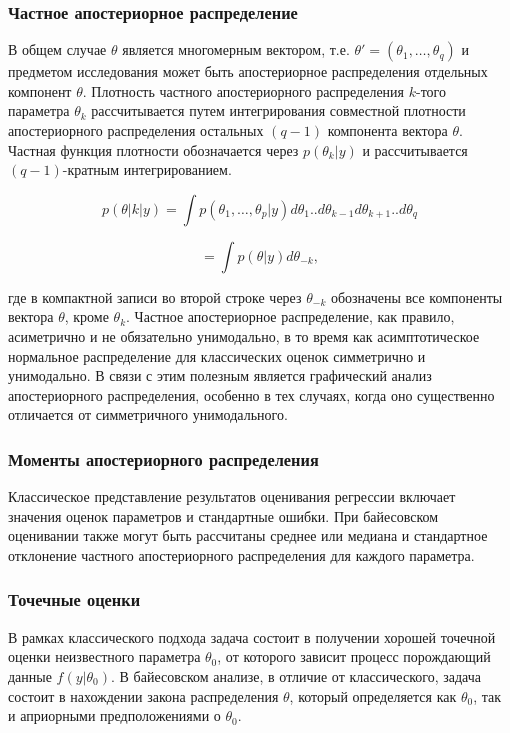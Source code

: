 \subsubsection*{Частное апостериорное распределение}

В общем случае $\theta$ является многомерным вектором, т.е. $\theta'=(\theta_1,\ldots ,\theta_q)$ и предметом исследования может быть апостериорное распределения отдельных компонент $\theta$. Плотность частного апостериорного распределения $k$-того параметра $\theta_k$ рассчитывается путем интегрирования совместной плотности апостериорного распределения остальных $(q-1)$ компонента вектора $\theta$. Частная функция плотности обозначается через $p(\theta_k|y)$ и рассчитывается $(q-1)$-кратным интегрированием.

\begin{equation}
p(\theta|k|y)=\int{p(\theta_1,\ldots ,\theta_p|y)d\theta_1..d\theta_{k-1}d\theta_{k+1}..d\theta_q}
\end{equation}

\[
=\int{p(\theta|y)d\theta_{-k}},
\]

где в компактной записи во второй строке через $\theta_{-k}$ обозначены все компоненты вектора $\theta$, кроме $\theta_k$. Частное апостериорное распределение, как правило, асиметрично и не обязательно унимодально, в то время как асимптотическое нормальное распределение для классических оценок симметрично и унимодально. В связи с этим полезным является графический анализ апостериорного распределения, особенно в тех случаях, когда оно существенно отличается от симметричного унимодального.

\subsubsection*{Моменты апостериорного распределения}

Классическое представление результатов оценивания регрессии включает значения оценок параметров и стандартные ошибки. При байесовском оценивании также могут быть рассчитаны среднее или медиана и стандартное отклонение частного апостериорного распределения для каждого параметра.

\subsubsection*{Точечные оценки}

В рамках классического подхода задача состоит в получении хорошей точечной оценки неизвестного  параметра $\theta_0$, от которого зависит процесс порождающий данные $f(y|\theta_0)$. В байесовском анализе, в отличие от классического, задача состоит в нахождении закона распределения $\theta$, который определяется как  $\theta_0$, так и априорными предположениями о  $\theta_0$.

